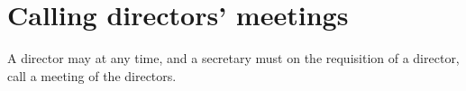 \section{Calling directors' meetings}

A director may at any time, and a secretary must on the requisition of a director, call a meeting of the directors. 